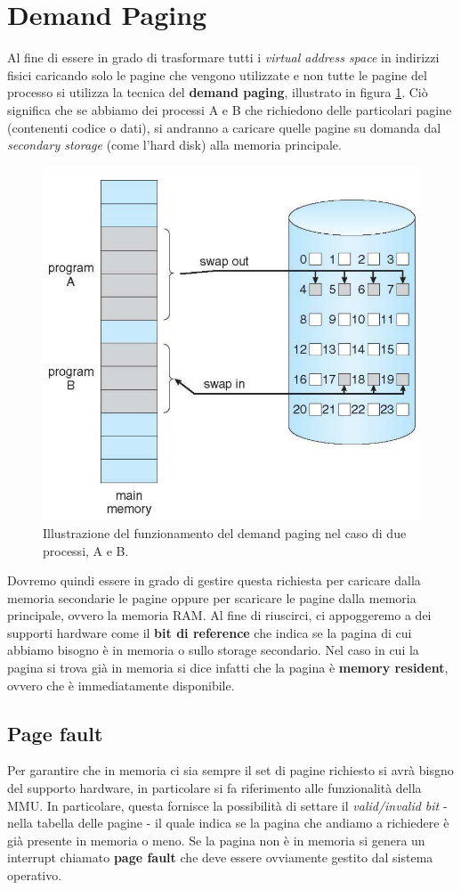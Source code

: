 \section{Demand Paging}
Al fine di essere in grado di trasformare tutti i \textit{virtual address space} in indirizzi fisici caricando solo le pagine che vengono utilizzate e non tutte le pagine del processo si utilizza la tecnica del \textbf{demand paging}, illustrato in figura \ref{fig:demand_paging}. Ciò significa che se abbiamo dei processi A e B che richiedono delle particolari pagine (contenenti codice o dati), si andranno a caricare quelle pagine su domanda dal \textit{secondary storage} (come l'hard disk) alla memoria principale.
\begin{figure}[h]
    \centering
    \includegraphics[width = .55\textwidth]{../res/imgs/virtual memory/demand_paging.png}
    \caption{Illustrazione del funzionamento del demand paging nel caso di due processi, A e B.}
    \label{fig:demand_paging}
\end{figure}
Dovremo quindi essere in grado di gestire questa richiesta per caricare dalla memoria secondarie le pagine oppure per scaricare le pagine dalla memoria principale, ovvero la memoria RAM. Al fine di riuscirci, ci appoggeremo a dei supporti hardware come il \textbf{bit di reference} che indica se la pagina di cui abbiamo bisogno è in memoria o sullo storage secondario. Nel caso in cui la pagina si trova già in memoria si dice infatti che la pagina è \textbf{memory resident}, ovvero che è immediatamente disponibile.

%
\subsection{Page fault}\label{page fault}
Per garantire che in memoria ci sia sempre il set di pagine richiesto si avrà bisgno del supporto hardware, in particolare si fa riferimento alle funzionalità della MMU. In particolare, questa fornisce la possibilità di settare il \textit{valid/invalid bit} - nella tabella delle pagine - il quale indica se la pagina che andiamo a richiedere è già presente in memoria o meno. Se la pagina non è in memoria si genera un interrupt chiamato \textbf{page fault} che deve essere ovviamente gestito dal sistema operativo.

